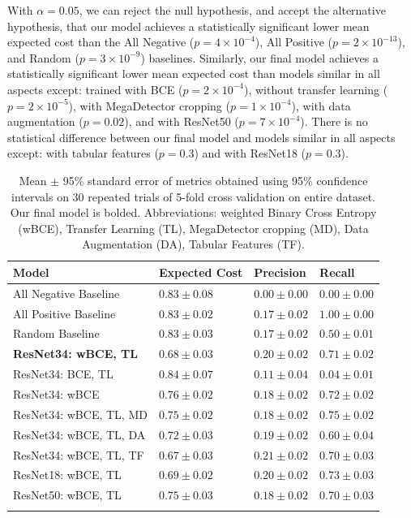 \documentclass{article}
\begin{document}
With $\alpha = 0.05$, we can reject the null hypothesis, and accept the alternative hypothesis, that our model achieves a statistically significant lower mean expected cost than the All Negative ($p = 4 \times 10^{-4}$), All Positive ($p = 2 \times 10^{-13}$), and Random ($p = 3\times 10^{-9}$) baselines. 
Similarly, our final model achieves a statistically significant lower mean expected cost than models similar in all aspects except: trained with BCE ($p = 2 \times 10^{-4}$), without transfer learning ($p = 2\times10^{-5}$), with MegaDetector cropping ($p = 1 \times 10^{-4}$), with data augmentation ($p = 0.02$), and with ResNet50 ($p = 7 \times 10^{-4}$). There is no statistical difference between our final model and models similar in all aspects except: with tabular features ($p = 0.3$) and with ResNet18 ($p = 0.3$).

\begin{table}[ht!]
  \label{t1}
  \caption{Mean $\pm$ 95\% standard error of metrics obtained using 95\% confidence intervals on 30 repeated trials of 5-fold cross validation on entire dataset. Our final model is bolded. Abbreviations: weighted Binary Cross Entropy (wBCE), Transfer Learning (TL), MegaDetector cropping (MD), 
Data Augmentation (DA), Tabular Features (TF).}
  \centering
  \begin{tabular}{llll}
  \toprule

    \topfigrule
    Model     & Expected Cost     & Precision & Recall \\
    \midrule
    All Negative Baseline & $0.83 \pm 0.08$    & $0.00 \pm 0.00$ & $0.00 \pm 0.00$     \\
    All Positive Baseline & $0.83 \pm 0.02$    & $0.17 \pm 0.02$ & $1.00 \pm 0.00$     \\
    Random Baseline & $0.83 \pm 0.03$    & $0.17 \pm 0.02$ & $0.50 \pm 0.01$     \\
    \midrule
    \textbf{ResNet34: wBCE, TL} & $0.68 \pm 0.03$ & $0.20 \pm 0.02$ & $0.71 \pm 0.02$     \\
    \midrule
    ResNet34: BCE, TL & $0.84 \pm 0.07$ & $0.11 \pm 0.04$ & $0.04 \pm 0.01$ \\
    ResNet34: wBCE & $0.76 \pm 0.02$ & $0.18 \pm 0.02$ & $0.72 \pm 0.02$     \\
    ResNet34: wBCE, TL, MD & $0.75 \pm 0.02$ & $0.18 \pm 0.02$ & $0.75 \pm 0.02$ \\
    ResNet34: wBCE, TL, DA & $0.72 \pm 0.03$ & $0.19 \pm 0.02$ & $0.60 \pm 0.04$ \\
    ResNet34: wBCE, TL, TF & $0.67 \pm 0.03$ & $0.21 \pm 0.02$ & $0.70 \pm 0.03$ \\
    ResNet18: wBCE, TL & $0.69 \pm 0.02$ & $0.20 \pm 0.02$ & $0.73 \pm 0.03$     \\
    ResNet50: wBCE, TL & $0.75 \pm 0.03$ & $0.18 \pm 0.02$ & $0.70 \pm 0.03$     \\
    \bottomrule \\
  \end{tabular}
\end{table}
\end{document}
